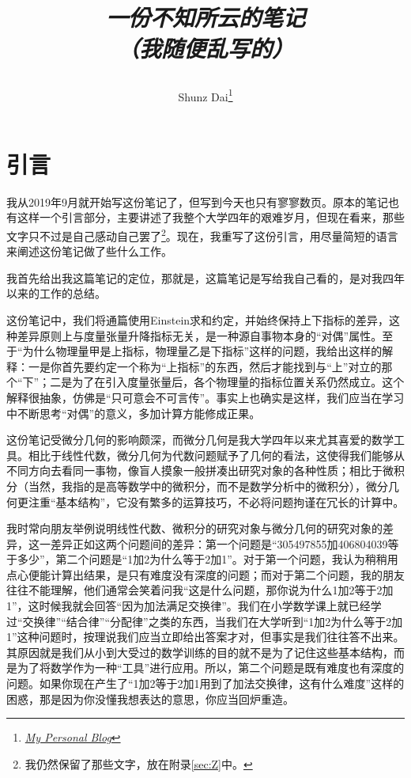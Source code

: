 \documentclass[10pt]{article}
\title{\begin{center}{\Huge \textit{一份不知所云的笔记}}\\{{\itshape （我随便乱写的）}}\end{center}}
\author{Shunz Dai\footnote{\href{https://ShunzDai.github.io/}{\textit{My Personal Blog}}}}
\affiliation{
Physics and Space Science College,China West Normal University
}
\begin{document}
	\maketitle
	\flushbottom
	\newpage
	\pagestyle{fancynotes}
	\part{引言}	

	我从2019年9月就开始写这份笔记了，但写到今天也只有寥寥数页。原本的笔记也有这样一个引言部分，主要讲述了我整个大学四年的艰难岁月，但现在看来，那些文字只不过是自己感动自己罢了\footnote{我仍然保留了那些文字，放在附录\ref{sec:Z}中。}。现在，我重写了这份引言，用尽量简短的语言来阐述这份笔记做了些什么工作。

	我首先给出我这篇笔记的定位，那就是，这篇笔记是写给我自己看的，是对我四年以来的工作的总结。

	这份笔记中，我们将通篇使用Einstein求和约定，并始终保持上下指标的差异，这种差异原则上与度量张量升降指标无关，是一种源自事物本身的“对偶”属性。至于“为什么物理量甲是上指标，物理量乙是下指标”这样的问题，我给出这样的解释：一是你首先要约定一个称为“上指标”的东西，然后才能找到与“上”对立的那个“下”；二是为了在引入度量张量后，各个物理量的指标位置关系仍然成立。这个解释很抽象，仿佛是“只可意会不可言传”。事实上也确实是这样，我们应当在学习中不断思考“对偶”的意义，多加计算方能修成正果。

	这份笔记受微分几何的影响颇深，而微分几何是我大学四年以来尤其喜爱的数学工具。相比于线性代数，微分几何为代数问题赋予了几何的看法，这使得我们能够从不同方向去看同一事物，像盲人摸象一般拼凑出研究对象的各种性质；相比于微积分（当然，我指的是高等数学中的微积分，而不是数学分析中的微积分），微分几何更注重“基本结构”，它没有繁多的运算技巧，不必将问题拘谨在冗长的计算中。
	
	我时常向朋友举例说明线性代数、微积分的研究对象与微分几何的研究对象的差异，这一差异正如这两个问题间的差异：第一个问题是“305497855加406804039等于多少”，第二个问题是“1加2为什么等于2加1”。对于第一个问题，我认为稍稍用点心便能计算出结果，是只有难度没有深度的问题；而对于第二个问题，我的朋友往往不能理解，他们通常会笑着问我“这是什么问题，那你说为什么1加2等于2加1”，这时候我就会回答“因为加法满足交换律”。我们在小学数学课上就已经学过“交换律”“结合律”“分配律”之类的东西，当我们在大学听到“1加2为什么等于2加1”这种问题时，按理说我们应当立即给出答案才对，但事实是我们往往答不出来。其原因就是我们从小到大受过的数学训练的目的就不是为了记住这些基本结构，而是为了将数学作为一种“工具”进行应用。所以，第二个问题是既有难度也有深度的问题。如果你现在产生了“1加2等于2加1用到了加法交换律，这有什么难度”这样的困惑，那是因为你没懂我想表达的意思，你应当回炉重造。
	
\end{document}
